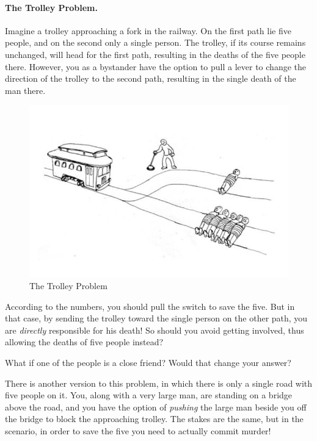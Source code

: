 \paragraph{The Trolley Problem.} Imagine a trolley approaching a fork in the railway. On the first path lie five people, and on the second only a single person. The trolley, if its course remains unchanged, will head for the first path, resulting in the deaths of the five people there. However, you as a bystander have the option to pull a lever to change the direction of the trolley to the second path, resulting in the single death of the man there.

\begin{figure}[!ht]
    \centering
    \includegraphics[width=\textwidth]{images/The_Trolley_Problem.jpg}
    \caption{The Trolley Problem}
    \label{fig:trolley_problem}
\end{figure}


According to the numbers, you should pull the switch to save the five. But in that case, by sending the trolley toward the single person on the other path, you are \textit{directly} responsible for his death! So should you avoid getting involved, thus allowing the deaths of five people instead?


What if one of the people is a close friend? Would that change your answer?


There is another version to this problem, in which there is only a single road with five people on it. You, along with a very large man, are standing on a bridge above the road, and you have the option of \textit{pushing} the large man beside you off the bridge to block the approaching trolley. The stakes are the same, but in the scenario, in order to save the five you need to actually commit murder!


